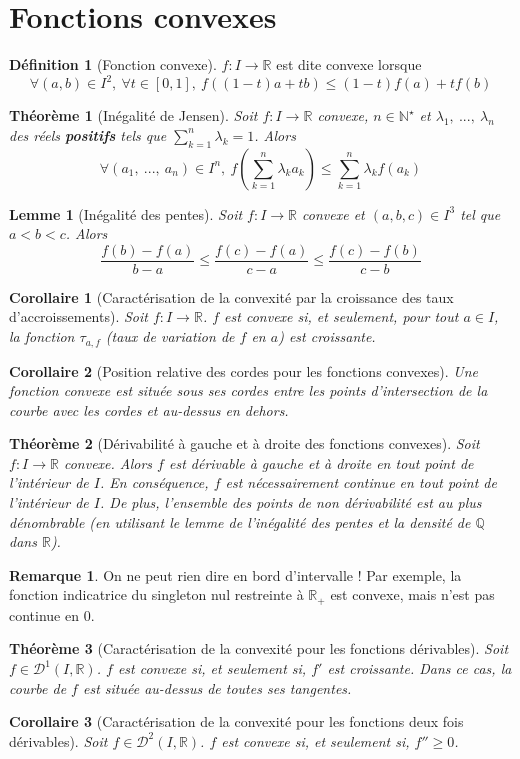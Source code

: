 \documentclass[french]{book}
\newcommand{\N}{\mathbb{N}}
\newcommand{\Q}{\mathbb{Q}}
\newcommand{\R}{\mathbb{R}}
\newcommand{\st}{^\star}
\theoremstyle{plain}
\newtheorem{thm}{Théorème}[chapter]
\newtheorem{lem}{Lemme}[chapter]
\newtheorem{cor}{Corollaire}[chapter]
\theoremstyle{definition}
\newtheorem{dfn}{Définition}[chapter]
\newtheorem{rmq}{Remarque}[chapter]
\theoremstyle{remark}
\begin{document}
\section{Fonctions convexes}
\begin{dfn}[Fonction convexe]
	$f:I\rightarrow\R$ est dite convexe lorsque $$\forall(a,b)\in I^2, \ \forall t\in\left[0,1\right], \ f((1-t)a+tb)\leqslant(1-t)f(a)+tf(b)$$
\end{dfn}
\begin{thm}[Inégalité de Jensen]
	Soit $f:I\rightarrow\R$ convexe, $n\in\N\st$ et $\lambda_1, \ ..., \ \lambda_n$ des réels \textbf{positifs} tels que $\displaystyle \sum_{k=1}^{n}\lambda_k=1$. Alors $$\forall(a_1, \ ..., \ a_n)\in I^n, \ f\left(\sum_{k=1}^{n}\lambda_ka_k\right)\leqslant \sum_{k=1}^{n}\lambda_kf(a_k)$$
\end{thm}
\begin{lem}[Inégalité des pentes]
	Soit $f:I\rightarrow\R$ convexe et $(a,b,c)\in I^3$ tel que $a<b<c$. Alors $$\frac{f(b)-f(a)}{b-a}\leqslant\frac{f(c)-f(a)}{c-a}\leqslant\frac{f(c)-f(b)}{c-b}$$
\end{lem}
\begin{cor}[Caractérisation de la convexité par la croissance des taux d'accroissements]
	Soit $f:I\rightarrow\R$. $f$ est convexe si, et seulement, pour tout $a\in I$, la fonction $\tau_{a,f}$ (taux de variation de $f$ en $a$) est croissante. 
\end{cor}
\begin{cor}[Position relative des cordes pour les fonctions convexes]
	Une fonction convexe est située sous ses cordes entre les points d'intersection de la courbe avec les cordes et au-dessus en dehors.
\end{cor}
\begin{thm}[Dérivabilité à gauche et à droite des fonctions convexes]
	Soit $f:I\rightarrow\R$ convexe. Alors $f$ est dérivable à gauche et à droite en tout point de l'intérieur de $I$. En conséquence, $f$ est nécessairement continue en tout point de l'intérieur de $I$. De plus, l'ensemble des points de non dérivabilité est au plus dénombrable (en utilisant le lemme de l'inégalité des pentes et la densité de $\Q$ dans $\R$).
\end{thm}
\begin{rmq} On ne peut rien dire en bord d'intervalle ! Par exemple, la fonction indicatrice du singleton nul restreinte à $\R_+$ est convexe, mais n'est pas continue en 0. \end{rmq}
\begin{thm}[Caractérisation de la convexité pour les fonctions dérivables]
	Soit $f\in\mathcal{D}^1(I,\R)$. $f$ est convexe si, et seulement si, $f'$ est croissante. Dans ce cas, la courbe de $f$ est située au-dessus de toutes ses tangentes.
\end{thm}
\begin{cor}[Caractérisation de la convexité pour les fonctions deux fois dérivables]
	Soit $f\in\mathcal{D}^2(I,\R)$. $f$ est convexe si, et seulement si, $f''\geqslant 0$.
\end{cor}
\end{document}
